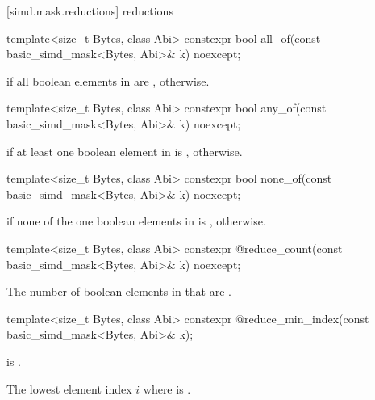 [simd.mask.reductions]{ reductions}

\begin{itemdecl}
template<size_t Bytes, class Abi>
  constexpr bool all_of(const basic_simd_mask<Bytes, Abi>& k) noexcept;
\end{itemdecl}

\begin{itemdescr}
  \pnum\returns
   if all boolean elements in  are ,  otherwise.
\end{itemdescr}

\begin{itemdecl}
template<size_t Bytes, class Abi>
  constexpr bool any_of(const basic_simd_mask<Bytes, Abi>& k) noexcept;
\end{itemdecl}

\begin{itemdescr}
  \pnum\returns
   if at least one boolean element in  is , 
  otherwise.
\end{itemdescr}

\begin{itemdecl}
template<size_t Bytes, class Abi>
  constexpr bool none_of(const basic_simd_mask<Bytes, Abi>& k) noexcept;
\end{itemdecl}

\begin{itemdescr}
  \pnum\returns
   if none of the one boolean elements in  is , 
  otherwise.
\end{itemdescr}

\begin{itemdecl}
template<size_t Bytes, class Abi>
  constexpr @\simdsizetype@ reduce_count(const basic_simd_mask<Bytes, Abi>& k) noexcept;
\end{itemdecl}

\begin{itemdescr}
  \pnum\returns
  The number of boolean elements in  that are .
\end{itemdescr}

\begin{itemdecl}
template<size_t Bytes, class Abi>
  constexpr @\simdsizetype@ reduce_min_index(const basic_simd_mask<Bytes, Abi>& k);
\end{itemdecl}

\begin{itemdescr}
  \pnum\expects
   is .

  \pnum\returns
  The lowest element index $i$ where  is .
\end{itemdescr}

